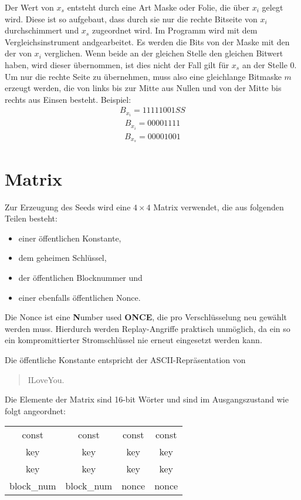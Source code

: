 \documentclass[10pt,a4paper]{article}
\begin{document}
Der Wert von $x_s$ entsteht durch eine Art Maske oder Folie, die über $x_i$ gelegt wird.
Diese ist so aufgebaut, dass durch sie nur die rechte Bitseite von $x_i$ durchschimmert und $x_s$ zugeordnet wird.
Im Programm wird mit dem Vergleichsinstrument \flqq and\frqq gearbeitet.
Es werden die Bits von der Maske mit den der von $x_i$ verglichen.
Wenn beide an der gleichen Stelle den gleichen Bitwert haben, wird dieser übernommen, ist dies nicht der Fall gilt für $x_s$ an der Stelle 0.
Um nur die rechte Seite zu übernehmen, muss also eine gleichlange Bitmaske $m$ erzeugt werden, die von links bis zur Mitte aus Nullen und von der Mitte bis rechts aus Einsen besteht.
Beispiel:
\begin{align*}
    B_{x_i} = 1111 1001SS
\end{align*}
\begin{align*}
    B_{x_i} = 0000 1111
\end{align*}
\begin{align*}
    B_{x_s} = 0000 1001
\end{align*}

\section{Matrix}

Zur Erzeugung des Seeds wird eine $4 \times 4$ Matrix verwendet, die aus folgenden Teilen besteht:
\begin{itemize}
    \item einer öffentlichen Konstante,
    \item dem geheimen Schlüssel,
    \item der öffentlichen Blocknummer und
    \item einer ebenfalls öffentlichen Nonce.
\end{itemize}
Die Nonce ist eine \glqq \textbf{N}umber used \textbf{ONCE}\grqq{}, die pro Verschlüsselung neu gewählt werden muss.
Hierdurch werden Replay-Angriffe praktisch unmöglich, da ein so ein kompromittierter Stromschlüssel nie erneut eingesetzt werden kann.

Die öffentliche Konstante entspricht der ASCII-Repräsentation von
\begin{quotation}
    \glqq ILoveYou\grqq{}.
\end{quotation}

Die Elemente der Matrix sind 16-bit Wörter und sind im Ausgangszustand wie folgt angeordnet:

\begin{center}
    \begin{tabular}{ c c c c }
        const      & const      & const & const \\
        key        & key        & key   & key   \\
        key        & key        & key   & key   \\
        block\_num & block\_num & nonce & nonce \\
    \end{tabular}
\end{center}
\end{document}
